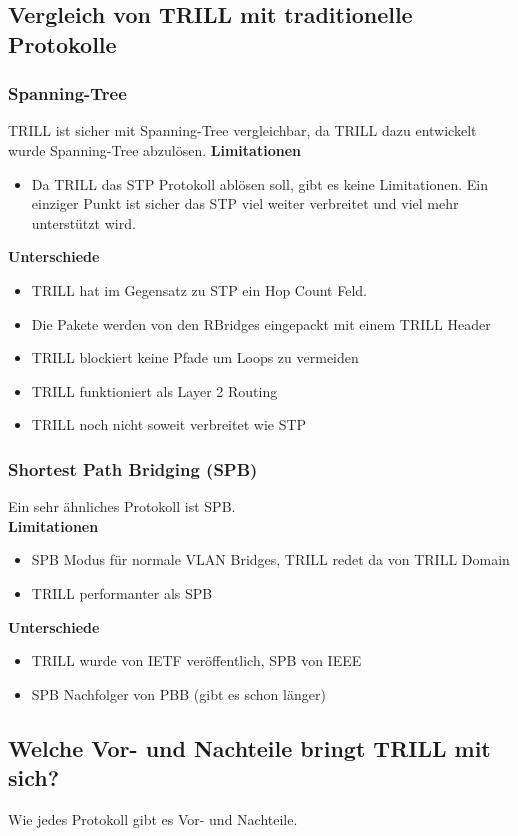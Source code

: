 \documentclass[a4,12pt]{scrartcl}
\begin{document}
\subsection{Vergleich von TRILL mit traditionelle Protokolle}
\subsubsection{Spanning-Tree}
TRILL ist sicher mit Spanning-Tree vergleichbar, da TRILL dazu entwickelt wurde Spanning-Tree abzulösen. \newpage
\textbf{Limitationen}
\begin{itemize}
\item Da TRILL das STP Protokoll ablösen soll, gibt es keine Limitationen. Ein einziger Punkt ist sicher das STP viel weiter verbreitet und viel mehr unterstützt wird. 
\end{itemize}
\textbf{Unterschiede}
\begin{itemize}
\item TRILL hat im Gegensatz zu STP ein Hop Count Feld. 
\item Die Pakete werden von den RBridges eingepackt mit einem TRILL Header
\item TRILL blockiert keine Pfade um Loops zu vermeiden 
\item TRILL funktioniert als Layer 2 Routing 
\item TRILL noch nicht soweit verbreitet wie STP 
\end{itemize}

\subsubsection{Shortest Path Bridging (SPB)}
Ein sehr ähnliches Protokoll ist SPB.  \\
\textbf{Limitationen}
\begin{itemize}
\item SPB Modus für normale VLAN Bridges, TRILL redet da von TRILL Domain
\item TRILL performanter als SPB 
\end{itemize}
\textbf{Unterschiede}
\begin{itemize}
\item TRILL wurde von IETF veröffentlich, SPB von IEEE
\item SPB Nachfolger von PBB (gibt es schon länger) 
\end{itemize}

\subsection{Welche Vor- und Nachteile bringt TRILL mit sich?}
Wie jedes Protokoll gibt es Vor- und Nachteile. 
\end{document}
